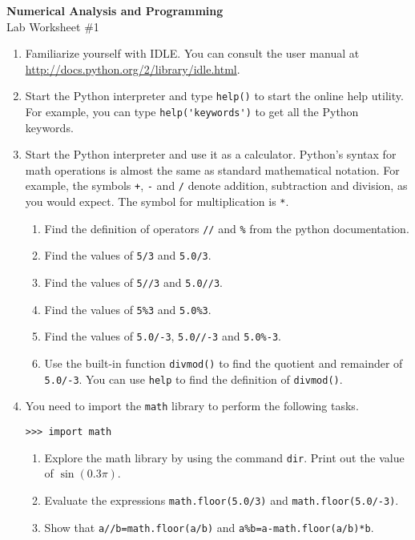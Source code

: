 \documentclass[12pt]{article}
\begin{document}
\begin{center}
\Large
\textbf{Numerical Analysis and Programming}\\
\large
Lab Worksheet \#1
\end{center}
\begin{enumerate}
\item Familiarize yourself with IDLE. You can consult the user manual at \url{http://docs.python.org/2/library/idle.html}.
\item Start the Python interpreter and type \texttt{help()} to start the online
help utility.  For example,  you can type \verb"help('keywords')" to get all the Python keywords.
\item Start the Python interpreter and use it as a calculator.
Python's syntax for math operations is almost the same as
standard mathematical notation.  For example, the symbols
\texttt{+}, \texttt{-} and \texttt{/} denote addition, subtraction
and division, as you would expect.  The symbol for
multiplication is \texttt{*}.
\begin{enumerate}
\item Find the definition of operators  \texttt{//} and \texttt{\%} from the python documentation.
\item Find the values of \texttt{5/3} and \texttt{5.0/3}.
\item Find the values of \texttt{5//3}  and \texttt{5.0//3}. 
\item Find the values of \texttt{5\%3} and \texttt{5.0\%3}. 
\item Find the values of \texttt{5.0/-3}, \texttt{5.0//-3} and \texttt{5.0\%-3}.
\item Use the built-in function \texttt{divmod()} to find the quotient and remainder of \texttt{5.0/-3}. You can use \texttt{help} to find the definition of \texttt{divmod()}.  
\end{enumerate}
\item You need to import the \texttt{math} library to perform the following tasks.
\begin{verbatim}
>>> import math
\end{verbatim} 
\begin{enumerate}
\item Explore the math library by using the command {\tt dir}. Print out the value of $\sin (0.3\pi)$.
\item Evaluate the expressions \texttt{math.floor(5.0/3)} and \texttt{math.floor(5.0/-3)}.
\item Show that \texttt{a//b=math.floor(a/b)} and \texttt{a\%b=a-math.floor(a/b)*b}.
\end{enumerate}
\end{enumerate}
\end{document}
